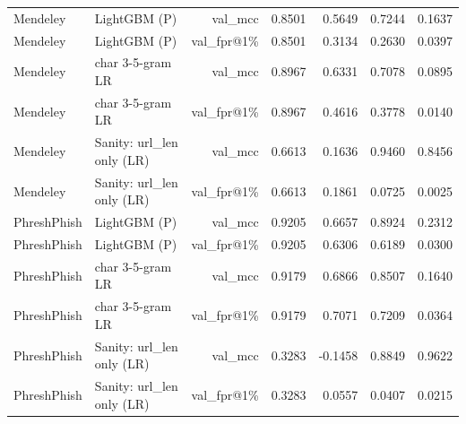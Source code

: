 \begin{table}[t]
\begin{tabular}{llrrrrr}
Mendeley & LightGBM (P) & val\_mcc & 0.8501 & 0.5649 & 0.7244 & 0.1637 \\
Mendeley & LightGBM (P) & val\_fpr@1\% & 0.8501 & 0.3134 & 0.2630 & 0.0397 \\
Mendeley & char 3-5-gram LR & val\_mcc & 0.8967 & 0.6331 & 0.7078 & 0.0895 \\
Mendeley & char 3-5-gram LR & val\_fpr@1\% & 0.8967 & 0.4616 & 0.3778 & 0.0140 \\
Mendeley & Sanity: url\_len only (LR) & val\_mcc & 0.6613 & 0.1636 & 0.9460 & 0.8456 \\
Mendeley & Sanity: url\_len only (LR) & val\_fpr@1\% & 0.6613 & 0.1861 & 0.0725 & 0.0025 \\
PhreshPhish & LightGBM (P) & val\_mcc & 0.9205 & 0.6657 & 0.8924 & 0.2312 \\
PhreshPhish & LightGBM (P) & val\_fpr@1\% & 0.9205 & 0.6306 & 0.6189 & 0.0300 \\
PhreshPhish & char 3-5-gram LR & val\_mcc & 0.9179 & 0.6866 & 0.8507 & 0.1640 \\
PhreshPhish & char 3-5-gram LR & val\_fpr@1\% & 0.9179 & 0.7071 & 0.7209 & 0.0364 \\
PhreshPhish & Sanity: url\_len only (LR) & val\_mcc & 0.3283 & -0.1458 & 0.8849 & 0.9622 \\
PhreshPhish & Sanity: url\_len only (LR) & val\_fpr@1\% & 0.3283 & 0.0557 & 0.0407 & 0.0215 \\
\bottomrule
\end{tabular}
\end{table}